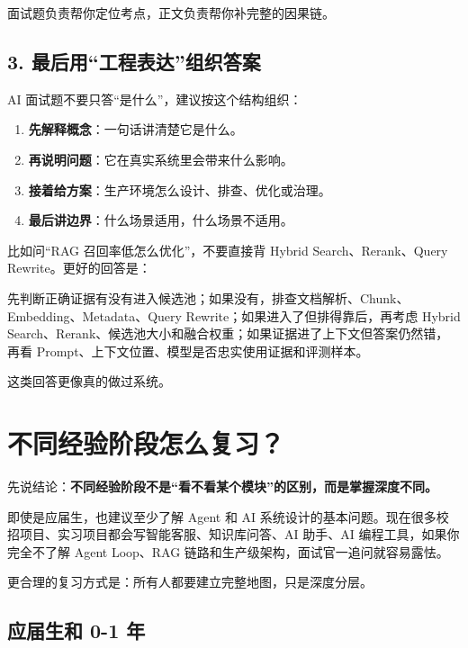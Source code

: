 \documentclass[9pt,a4paper,twocolumn]{ctexart}
\begin{document}
面试题负责帮你定位考点，正文负责帮你补完整的因果链。



\subsection*{3. 最后用“工程表达”组织答案}


AI 面试题不要只答“是什么”，建议按这个结构组织：


\begin{enumerate}[itemsep=1pt, topsep=2pt]
  \item \textbf{先解释概念}：一句话讲清楚它是什么。
  \item \textbf{再说明问题}：它在真实系统里会带来什么影响。
  \item \textbf{接着给方案}：生产环境怎么设计、排查、优化或治理。
  \item \textbf{最后讲边界}：什么场景适用，什么场景不适用。
\end{enumerate}


比如问“RAG 召回率低怎么优化”，不要直接背 Hybrid Search、Rerank、Query Rewrite。更好的回答是：



先判断正确证据有没有进入候选池；如果没有，排查文档解析、Chunk、Embedding、Metadata、Query Rewrite；如果进入了但排得靠后，再考虑 Hybrid Search、Rerank、候选池大小和融合权重；如果证据进了上下文但答案仍然错，再看 Prompt、上下文位置、模型是否忠实使用证据和评测样本。



这类回答更像真的做过系统。



\section*{不同经验阶段怎么复习？}


先说结论：\textbf{不同经验阶段不是“看不看某个模块”的区别，而是掌握深度不同。}



即使是应届生，也建议至少了解 Agent 和 AI 系统设计的基本问题。现在很多校招项目、实习项目都会写智能客服、知识库问答、AI 助手、AI 编程工具，如果你完全不了解 Agent Loop、RAG 链路和生产级架构，面试官一追问就容易露怯。



更合理的复习方式是：所有人都要建立完整地图，只是深度分层。



\subsection*{应届生和 0-1 年}
\end{document}
